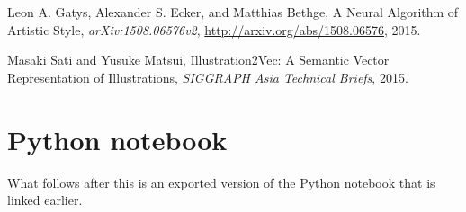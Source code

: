 \documentclass{article}
\begin{document}
\begin{thebibliography}{9}

 Leon A. Gatys, Alexander S. Ecker, and
  Matthias Bethge, A Neural Algorithm of Artistic Style,
  \emph{arXiv:1508.06576v2}, \url{http://arxiv.org/abs/1508.06576},
  2015.

Masaki Sati and Yusuke Matsui,
  Illustration2Vec: A Semantic Vector Representation of Illustrations,
  \emph{SIGGRAPH Asia Technical Briefs}, 2015.
  
\end{thebibliography}

\section{Python notebook}

What follows after this is an exported version of the Python notebook
that is linked earlier.
\end{document}
